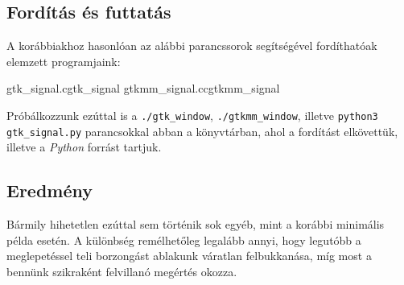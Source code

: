 \subsection{Fordítás és futtatás}

A korábbiakhoz hasonlóan az alábbi parancssorok segítségével fordíthatóak elemzett programjaink:

\lstcompiles
{gtk_signal.c}{gtk_signal}
{gtkmm_signal.cc}{gtkmm_signal}

Próbálkozzunk ezúttal is a \texttt{./gtk\_window}, \texttt{./gtkmm\_window}, illetve \texttt{python3 gtk\_signal.py} parancsokkal abban a könyvtárban, ahol a fordítást elkövettük, illetve a \textit{Python} forrást tartjuk.

\subsection{Eredmény}

Bármily hihetetlen ezúttal sem történik sok egyéb, mint a korábbi minimális példa esetén. A különbség remélhetőleg legalább annyi, hogy legutóbb a meglepetéssel teli borzongást ablakunk váratlan felbukkanása, míg most a bennünk szikraként felvillanó megértés okozza.
